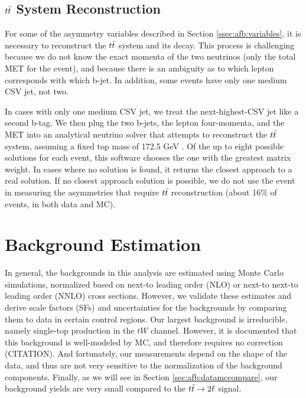 \subsection{\texorpdfstring{$t\bar{t}$}{ttbar} System Reconstruction}
\label{ssec:afb:ttbarreconstruction}

For some of the asymmetry variables described in Section
\ref{ssec:afb:variables}, it is necessary to reconstruct the $t\bar{t}$
system and its decay. This process is challenging because we do not
know the exact momenta of the two neutrinos (only the total MET for
the event), and because there is an ambiguity as to which lepton
corresponds with which b-jet. In addition, some events have only one
medium CSV jet, not two.

In cases with only one medium CSV jet, we treat the next-highest-CSV
jet like a second b-tag. We then plug the two b-jets, the lepton
four-momenta, and the MET into an analytical neutrino solver that
attempts to reconstruct the $t\bar{t}$ system, assuming a fixed top mass
of 172.5 GeV \cite{nusolver}. Of the up to eight possible solutions
for each event, this software chooses the one with the greatest matrix
weight. In cases where no solution is found, it returns the closest
approach to a real solution. If no closest approach solution is
possible, we do not use the event in measuring the asymmetries that
require $t\bar{t}$ reconstruction (about 16\% of events, in both data
and MC).


\section{Background Estimation}
\label{sec:afb:background}

In general, the backgrounds in this analysis are estimated using Monte
Carlo simulations, normalized based on next-to leading order (NLO) or
next-to next-to leading order (NNLO) cross sections. However, we
validate these estimates and
derive scale factors (SFs) and uncertainties for the backgrounds by
comparing them to data in certain control regions. Our largest
background is irreducible, namely single-top production
in the $tW$ channel. However, it is documented that this background is
well-modeled by MC, and therefore requires no correction (CITATION). %
And fortunately, our measurements depend on the shape of the data, and
thus are not very sensitive to the normalization of the background
components. Finally, as we will see in Section
\ref{sec:afb:datamccompare}, our background yields are very small
compared to the $t\bar{t} \rightarrow 2\ell$ signal.

